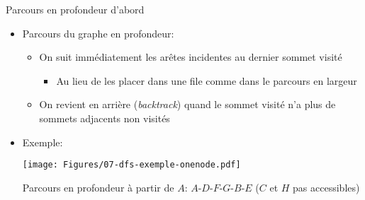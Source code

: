 \begin{frame}{Parcours en profondeur d'abord}

\begin{itemize}
\item Parcours du graphe en profondeur:
\begin{itemize}
\item On suit immédiatement les arêtes incidentes au dernier sommet visité
\begin{itemize}
\item Au lieu de les placer dans une file comme dans le parcours en largeur
\end{itemize}
\item On revient en arrière ({\it backtrack}) quand le sommet visité
  n'a plus de sommets adjacents non visités
\end{itemize}

\bigskip

\item Exemple:
\centerline{\texttt{[image: Figures/07-dfs-exemple-onenode.pdf]}}

\bigskip

Parcours en profondeur à partir de $A$: $A$-$D$-$F$-$G$-$B$-$E$ ($C$ et $H$ pas accessibles)
\end{itemize}


\end{frame}





